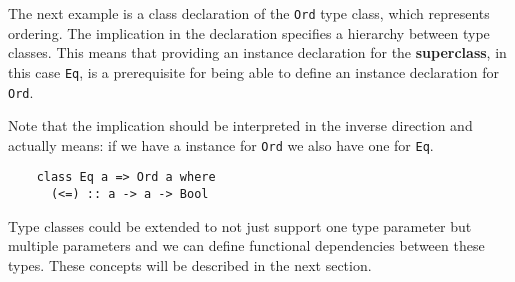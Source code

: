 The next example is a class declaration of the \texttt{Ord} type class, which
represents ordering. The implication in the declaration specifies a hierarchy
between type classes. This means that providing an instance declaration for the
\textbf{superclass}, in this case \texttt{Eq}, is a prerequisite for being
able to define an instance declaration for \texttt{Ord}.

Note that the implication should be interpreted in the inverse direction and
actually means: if we have a instance for \texttt{Ord} we also have one for
\texttt{Eq}.
\begin{verbatim}
    class Eq a => Ord a where
      (<=) :: a -> a -> Bool
\end{verbatim}
%
Type classes could be extended to not just support one type parameter but
multiple parameters and we can define functional dependencies between these
types. These concepts will be described in the next section.
